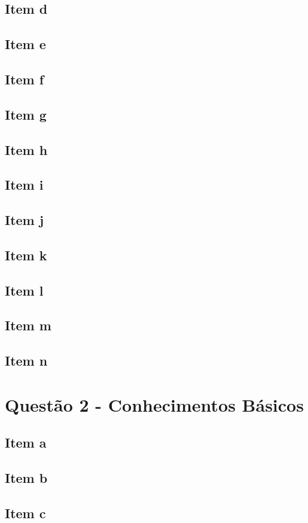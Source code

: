 \documentclass[a4paper, 12pt]{article}
\begin{document}
		\subsection{Item d}	
		\subsection{Item e}	
		\subsection{Item f}	
		\subsection{Item g}	
		\subsection{Item h}	
		\subsection{Item i}	
		\subsection{Item j}	
		\subsection{Item k}	
		\subsection{Item l}	
		\subsection{Item m}	
		\subsection{Item n}		
	\section{Quest\~{a}o 2 - Conhecimentos Básicos}
		\subsection{Item a}	
		\subsection{Item b}	
		\subsection{Item c}	
\end{document}
